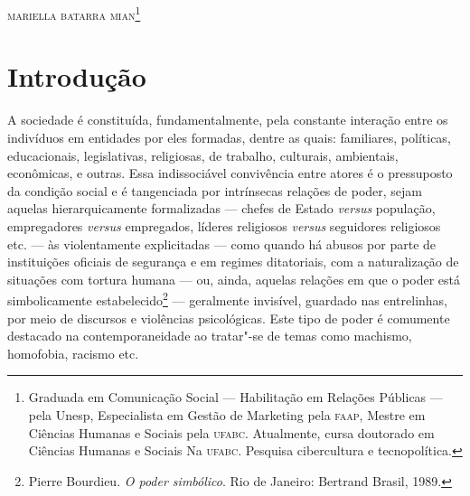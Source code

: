 

\begin{flushright}
\textsc{mariella batarra mian\footnote{Graduada em Comunicação Social --- Habilitação em Relações Públicas --- pela Unesp, Especialista em Gestão de Marketing pela \textsc{faap}, Mestre em Ciências Humanas e Sociais pela \textsc{ufabc}. Atualmente, cursa doutorado em Ciências Humanas e Sociais Na \textsc{ufabc}. Pesquisa cibercultura e tecnopolítica.}}
\end{flushright}


 \section{Introdução}

\noindent{}A sociedade é constituída, fundamentalmente, pela constante interação
entre os indivíduos em entidades por eles formadas, dentre as quais:
familiares, políticas, educacionais, legislativas, religiosas, de
trabalho, culturais, ambientais, econômicas, e outras. Essa
indissociável convivência entre atores é o pressuposto da condição
social e é tangenciada por intrínsecas relações de poder, sejam aquelas
hierarquicamente formalizadas --- chefes de Estado \emph{versus}
população, empregadores \emph{versus} empregados, líderes religiosos
\emph{versus} seguidores religiosos etc. --- às violentamente
explicitadas --- como quando há abusos por parte de instituições oficiais
de segurança e em regimes ditatoriais, com a naturalização de situações
com tortura humana --- ou, ainda, aquelas relações em que o poder está
simbolicamente estabelecido\footnote{Pierre Bourdieu. \emph{O poder simbólico}. Rio de Janeiro: Bertrand Brasil, 1989.} --- geralmente invisível,
guardado nas entrelinhas, por meio de discursos e violências
psicológicas. Este tipo de poder é comumente destacado na
contemporaneidade ao tratar"-se de temas como machismo, homofobia,
racismo etc.


